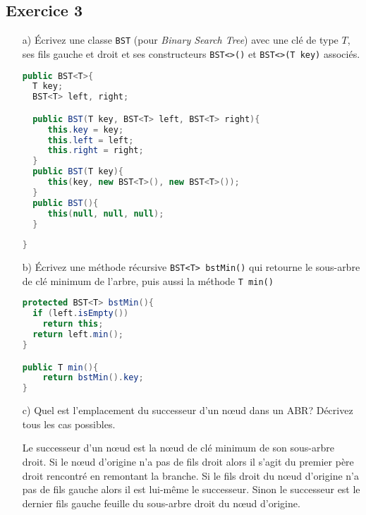\documentclass[iutinfo,a4paper,10pt]{ustl-tdtp}
\begin{document}
\subsection*{Exercice 3}
\begin{enumerate}

\item [a)] Écrivez une classe \texttt{BST} (pour \textit{Binary Search
    Tree}) avec une clé de type $T$, ses
  fils gauche et droit et ses constructeurs \texttt{BST<>()} et \texttt{BST<>(T key)}
  associés. 
\begin{solution}
{\color{red}
\begin{lstlisting}[language=Java]
public BST<T>{
  T key;
  BST<T> left, right;

  public BST(T key, BST<T> left, BST<T> right){
     this.key = key;
     this.left = left;
     this.right = right;
  }
  public BST(T key){
     this(key, new BST<T>(), new BST<T>());
  }
  public BST(){
     this(null, null, null);
  }
  
}
\end{lstlisting}
}
\end{solution}

\item [b)] Écrivez une méthode récursive \texttt{BST<T> bstMin()} qui
  retourne le sous-arbre de clé minimum de l'arbre, puis aussi la
  méthode \texttt{T min()}
\begin{solution}
{\color{red}
\begin{lstlisting}[language=Java]
protected BST<T> bstMin(){
  if (left.isEmpty()) 
    return this;
  return left.min();
}

public T min(){
    return bstMin().key;
}
\end{lstlisting}
}
\end{solution}

\item [c)] Quel est l'emplacement du successeur d'un n\oe ud dans un ABR? Décrivez tous les cas possibles.\\
\begin{solution}
{\color{red}
Le successeur d'un n\oe ud est la n\oe ud de clé minimum de son
sous-arbre droit. Si le n\oe ud d'origine n'a pas de fils droit alors il
s'agit du premier père droit rencontré en remontant la branche. Si le
fils droit du n\oe ud d'origine n'a pas de fils gauche alors il est
lui-même le successeur. Sinon le successeur est le dernier fils gauche
feuille du sous-arbre droit du n\oe ud d'origine.
}
\end{solution}


\end{enumerate}
\end{document}
